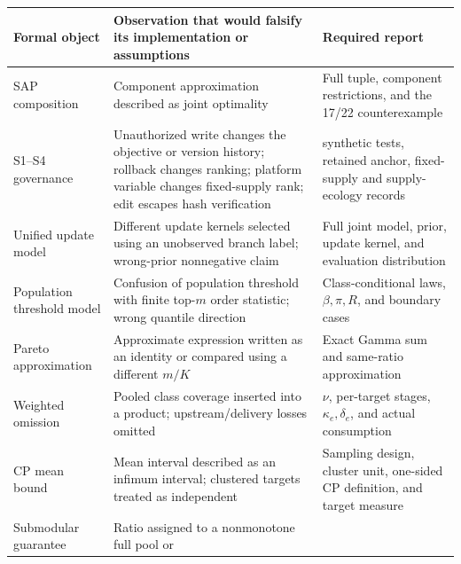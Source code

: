 \documentclass[
  11pt]{article}
\begin{document}
\begin{longtable}[]{@{}
  >{\raggedright\arraybackslash}p{}
  >{\raggedright\arraybackslash}p{}
  >{\raggedright\arraybackslash}p{}@{}}
\toprule\noalign{}
\begin{minipage}[b]{\linewidth}\raggedright
Formal object
\end{minipage} & \begin{minipage}[b]{\linewidth}\raggedright
Observation that would falsify its implementation or assumptions
\end{minipage} & \begin{minipage}[b]{\linewidth}\raggedright
Required report
\end{minipage} \\
\midrule\noalign{}
\endhead
\bottomrule\noalign{}
\endlastfoot
SAP composition & Component approximation described as joint optimality
& Full tuple, component restrictions, and the 17/22 counterexample \\
S1--S4 governance & Unauthorized write changes the objective or version
history; rollback changes ranking; platform variable changes
fixed-supply rank; edit escapes hash verification & 14 synthetic tests,
retained anchor, fixed-supply and supply-ecology records \\
Unified update model & Different update kernels selected using an
unobserved branch label; wrong-prior nonnegative claim & Full joint
model, prior, update kernel, and evaluation distribution \\
Population threshold model & Confusion of population threshold with
finite top-\(m\) order statistic; wrong quantile direction &
Class-conditional laws, \(\beta,\pi,R\), and boundary cases \\
Pareto approximation & Approximate expression written as an identity or
compared using a different \(m/K\) & Exact Gamma sum and same-ratio
approximation \\
Weighted omission & Pooled class coverage inserted into a product;
upstream/delivery losses omitted & \(\nu\), per-target stages,
\(\kappa_e,\delta_e\), and actual consumption \\
CP mean bound & Mean interval described as an infimum interval;
clustered targets treated as independent & Sampling design, cluster
unit, one-sided CP definition, and target measure \\
Submodular guarantee & Ratio assigned to a nonmonotone full pool or

\end{longtable}
\end{document}
